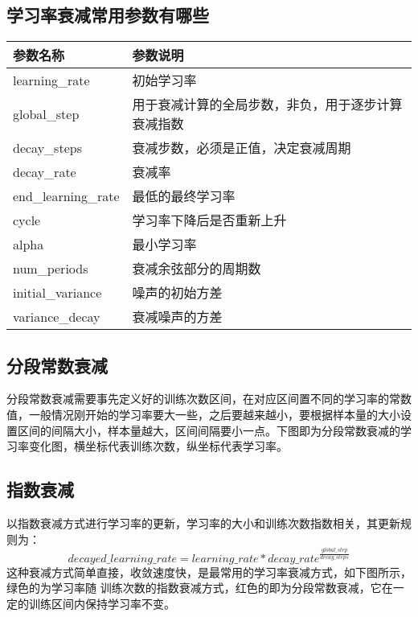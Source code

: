 \subsection{学习率衰减常用参数有哪些}\label{ux5b66ux4e60ux7387ux8870ux51cfux5e38ux7528ux53c2ux6570ux6709ux54eaux4e9b}

\begin{longtable}[]{ ll }
\toprule
参数名称 & 参数说明\tabularnewline
\midrule
\endhead
learning\_rate & 初始学习率\tabularnewline
global\_step &
用于衰减计算的全局步数，非负，用于逐步计算衰减指数\tabularnewline
decay\_steps & 衰减步数，必须是正值，决定衰减周期\tabularnewline
decay\_rate & 衰减率\tabularnewline
end\_learning\_rate & 最低的最终学习率\tabularnewline
cycle & 学习率下降后是否重新上升\tabularnewline
alpha & 最小学习率\tabularnewline
num\_periods & 衰减余弦部分的周期数\tabularnewline
initial\_variance & 噪声的初始方差\tabularnewline
variance\_decay & 衰减噪声的方差\tabularnewline
\bottomrule
\end{longtable}

\subsection{分段常数衰减}\label{ux5206ux6bb5ux5e38ux6570ux8870ux51cf}

​
分段常数衰减需要事先定义好的训练次数区间，在对应区间置不同的学习率的常数值，一般情况刚开始的学习率要大一些，之后要越来越小，要根据样本量的大小设置区间的间隔大小，样本量越大，区间间隔要小一点。下图即为分段常数衰减的学习率变化图，横坐标代表训练次数，纵坐标代表学习率。

 

\subsection{ 指数衰减}\label{ux6307ux6570ux8870ux51cf}

​
以指数衰减方式进行学习率的更新，学习率的大小和训练次数指数相关，其更新规则为：
\[
decayed{\_}learning{\_}rate =learning{\_}rate*decay{\_}rate^{\frac{global{\_step}}{decay{\_}steps}}
\] ​
这种衰减方式简单直接，收敛速度快，是最常用的学习率衰减方式，如下图所示，绿色的为学习率随
训练次数的指数衰减方式，红色的即为分段常数衰减，它在一定的训练区间内保持学习率不变。

 
